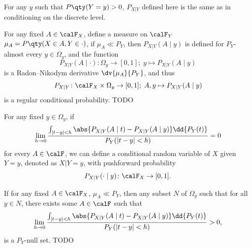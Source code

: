 \documentclass[a4paper,12pt]{report}
\begin{document}
For any $y$ such that $P\qty(Y=y)>0$, $P_{X|Y}$ defined here is the same as in conditioning on the discrete level.

For any fixed $A\in\calF_X$, define a measure on $\calF_Y$ $\mu_A=P\qty(X\in A,Y\in\cdot)$, if $\mu_A\ll P_Y$, then $P_{X|Y}(A\mid y)$ is defined for $P_Y$-almost every $y\in\Omega_y$, and the function
\[P_{X|Y}(A\mid\cdot)\colon\Omega_y\to[0,1];\;y\mapsto P_{X|Y}(A\mid y)\]
is a Radon–Nikodym derivative $\dv{\mu_A}{P_Y}$, and thus
\[P_{X|Y}\colon\calF_X\times\Omega_y\to[0,1];\;A,y\mapsto P_{X|Y}(A\mid y)\]
is a regular conditional probability.
\bpr
TODO
\epr

For any fixed $y\in\Omega_y$, if
\[\lim_{h\to0}\frac{\int_{|t-y|<h}\abs{P_{X|Y}(A\mid t)-P_{X|Y}(A\mid y)}\dd{P_Y(t)}}{P_Y(|t-y|<h)}=0\]
for every $A\in\calF$, we can define a conditional random variable of $X$ given $Y=y$, denoted as $X|Y=y$, with pushforward probability
\[P_{X|Y}(\cdot\mid y)\colon\calF_X\to[0,1].\]

If for any fixed $A\in\calF_X$, $\mu_A\ll P_Y$, then any subset $N$ of $\Omega_y$ such that for all $y\in N$, there exists some $A\in\calF$ such that
\[\lim_{h\to0}\frac{\int_{|t-y|<h}\abs{P_{X|Y}(A\mid t)-P_{X|Y}(A\mid y)}\dd{P_Y(t)}}{P_Y(|t-y|<h)}>0,\]
is a $P_Y$-null set.
\bpr
TODO
\epr
\end{document}
